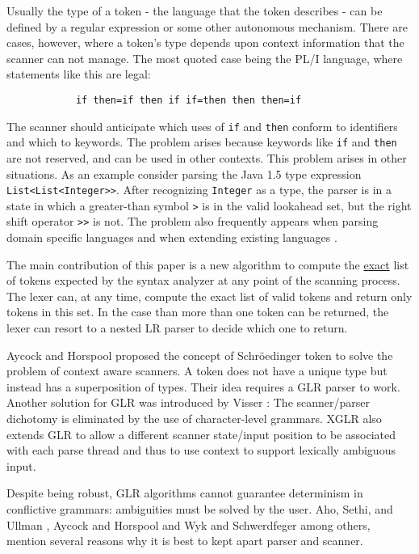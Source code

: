 

Usually the type of a token - the language that the token describes -
can be defined by a regular expression or some other autonomous mechanism.
There are cases, however, where a token's type depends upon context 
information that the scanner can not manage.
The most quoted case being the PL/I language, where statements like this are legal:
\begin{verbatim}
            if then=if then if if=then then then=if
\end{verbatim}
The scanner should anticipate which uses of \verb|if| and \verb|then|
conform to identifiers and which to keywords.
The problem arises because keywords like \verb|if| and \verb|then|
are not reserved, and can be used in other
contexts. 
This problem arises in other situations. As an example consider parsing the Java 1.5 type expression 
\verb|List<List<Integer>>|. After recognizing \verb|Integer| as a type,
the parser is in a state in which a greater-than symbol \verb|>| is in
the valid lookahead set, but the right shift operator \verb|>>| is not.
The problem also frequently appears when parsing domain specific
languages and when extending existing languages \cite{schrodingerstoken,wyk}.

The main contribution of this paper is 
a new algorithm to compute the \underline{exact} list of tokens 
expected by the syntax analyzer at any point of the scanning process.
The lexer can, at any time, compute the exact list of valid
tokens and return only tokens in this set.
In the case than more than one token can be returned, the lexer 
can resort to a nested LR parser to decide which one to return. 


Aycock and Horspool \cite{schrodingerstoken} proposed
the concept of Schr\"{o}edinger token to solve the problem of context aware scanners.
A token does not have a unique type but instead has a superposition of types.
Their idea requires a GLR parser to work. 
Another solution for GLR was introduced by Visser \cite{visser2}:
The scanner/parser dichotomy is eliminated
by the use of character-level grammars.
XGLR \cite{xglr} also extends
GLR to allow a different scanner state/input position to be
associated with each parse thread and thus to use context to
support lexically ambiguous input. 

Despite being robust, GLR algorithms
cannot guarantee determinism in conflictive grammars:
ambiguities must be solved by the user.
Aho, Sethi, and Ullman \cite[p.84-85]{aho1986}, 
Aycock and Horspool
\cite{schrodingerstoken} and 
Wyk and Schwerdfeger \cite{wyk}
among others,
mention several reasons why it is best to kept apart parser
and scanner.

